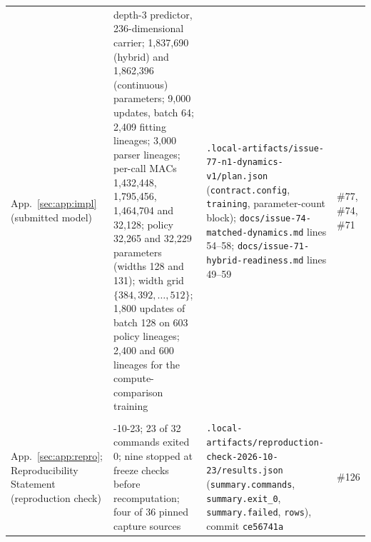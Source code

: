 {\begin{revblock}
\begin{longtable}{@{}>{\raggedright\arraybackslash}p{}>{\raggedright\arraybackslash}p{}>{\raggedright\arraybackslash}p{}>{\raggedright\arraybackslash}p{}@{}}
App.~\ref{sec:app:impl} (submitted model) & {\color{black}depth-3 predictor, 236-dimensional carrier; 1{,}837{,}690 (hybrid) and 1{,}862{,}396 (continuous) parameters; 9{,}000 updates, batch 64; 2{,}409 fitting lineages}; 3,000 parser lineages; per-call MACs 1,432,448, 1,795,456, 1,464,704 and 32,128; policy 32,265 and 32,229 parameters (widths 128 and 131); width grid $\{384,392,\dots,512\}$; 1,800 updates of batch 128 on 603 policy lineages; 2,400 and 600 lineages for the compute-comparison training & {\color{black}\nolinkurl{.local-artifacts/issue-77-n1-dynamics-v1/plan.json} (\texttt{contract.config}, \texttt{training}, parameter-count block)}; \nolinkurl{docs/issue-74-matched-dynamics.md} lines 54--58; \nolinkurl{docs/issue-71-hybrid-readiness.md} lines 49--59 & {\color{black}\#77}, \#74, \#71 \\
\multicolumn{4}{@{}l}{\emph{This appendix and the Reproducibility Statement}} \\
App.~\ref{sec:app:repro}; Reproducibility Statement (reproduction check) & 2026-10-23; 23 of 32 commands exited 0; nine stopped at freeze checks before recomputation; four of 36 pinned capture sources & \nolinkurl{.local-artifacts/reproduction-check-2026-10-23/results.json} (\nolinkurl{summary.commands}, \nolinkurl{summary.exit_0}, \nolinkurl{summary.failed}, \nolinkurl{rows}), commit \texttt{ce56741a} & \#126 \\
\end{longtable}
\end{revblock}
}
